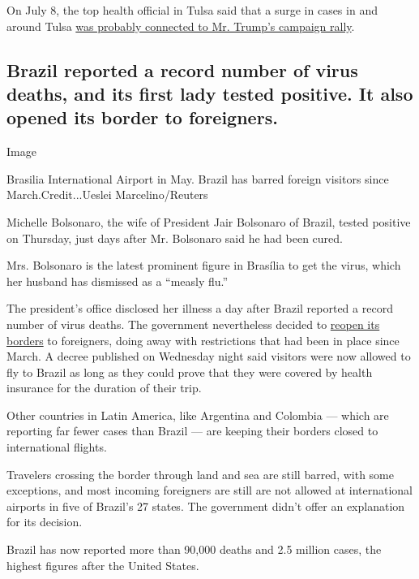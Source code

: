 On July 8, the top health official in Tulsa said that a surge in cases
in and around Tulsa
\href{https://www.nytimes3xbfgragh.onion/2020/07/08/us/politics/coronavirus-tulsa-trump-rally.html}{was
probably connected to Mr. Trump's campaign rally}.

\hypertarget{brazil-reported-a-record-number-of-virus-deaths-and-its-first-lady-tested-positive-it-also-opened-its-border-to-foreigners}{%
\subsection{Brazil reported a record number of virus deaths, and its
first lady tested positive. It also opened its border to
foreigners.}\label{brazil-reported-a-record-number-of-virus-deaths-and-its-first-lady-tested-positive-it-also-opened-its-border-to-foreigners}}

Image

Brasilia International Airport in May. Brazil has barred foreign
visitors since March.Credit...Ueslei Marcelino/Reuters

Michelle Bolsonaro, the wife of President Jair Bolsonaro of Brazil,
tested positive on Thursday, just days after Mr. Bolsonaro said he had
been cured.

Mrs. Bolsonaro is the latest prominent figure in Brasília to get the
virus, which her husband has dismissed as a ``measly flu.''

The president's office disclosed her illness a day after Brazil reported
a record number of virus deaths. The government nevertheless decided to
\href{http://www.in.gov.br/en/web/dou/-/portaria-cc-pr/mjsp/minfra/ms-n-1-de-29-de-julho-de-2020-269235614}{reopen
its borders} to foreigners, doing away with restrictions that had been
in place since March. A decree published on Wednesday night said
visitors were now allowed to fly to Brazil as long as they could prove
that they were covered by health insurance for the duration of their
trip.

Other countries in Latin America, like Argentina and Colombia --- which
are reporting far fewer cases than Brazil --- are keeping their borders
closed to international flights.

Travelers crossing the border through land and sea are still barred,
with some exceptions, and most incoming foreigners are still are not
allowed at international airports in five of Brazil's 27 states. The
government didn't offer an explanation for its decision.

Brazil has now reported more than 90,000 deaths and 2.5 million cases,
the highest figures after the United States.

